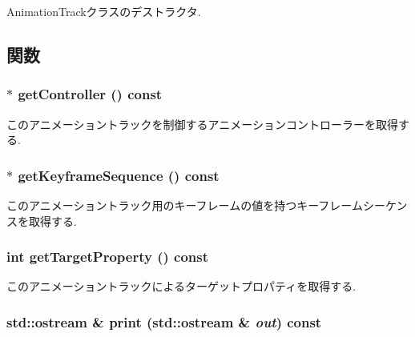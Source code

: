 AnimationTrackクラスのデストラクタ. 

\subsection{関数}
\hypertarget{classm3g_1_1AnimationTrack_3a54e89528127de5b4d0a48a2045a91c}{
\subsubsection[{getController}]{ $\ast$ getController () const}}
\label{classm3g_1_1AnimationTrack_3a54e89528127de5b4d0a48a2045a91c}


このアニメーショントラックを制御するアニメーションコントローラーを取得する. \hypertarget{classm3g_1_1AnimationTrack_e83c81771a8329e1e5f978f228c0b308}{
\subsubsection[{getKeyframeSequence}]{ $\ast$ getKeyframeSequence () const}}
\label{classm3g_1_1AnimationTrack_e83c81771a8329e1e5f978f228c0b308}


このアニメーショントラック用のキーフレームの値を持つキーフレームシーケンスを取得する. \hypertarget{classm3g_1_1AnimationTrack_143de0bf90b434f1487caae5b0b66bbf}{
\subsubsection[{getTargetProperty}]{\setlength{\rightskip}{0pt plus 5cm}int getTargetProperty () const}}
\label{classm3g_1_1AnimationTrack_143de0bf90b434f1487caae5b0b66bbf}


このアニメーショントラックによるターゲットプロパティを取得する. \hypertarget{classm3g_1_1AnimationTrack_6fea17fa1532df3794f8cb39cb4f911f}{
\subsubsection[{print}]{\setlength{\rightskip}{0pt plus 5cm}std::ostream \& print (std::ostream \& {\em out}) const}}
\label{classm3g_1_1AnimationTrack_6fea17fa1532df3794f8cb39cb4f911f}


